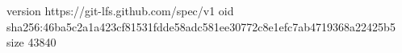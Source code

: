 version https://git-lfs.github.com/spec/v1
oid sha256:46ba5c2a1a423cf81531fdde58adc581ee30772c8e1efc7ab4719368a22425b5
size 43840
